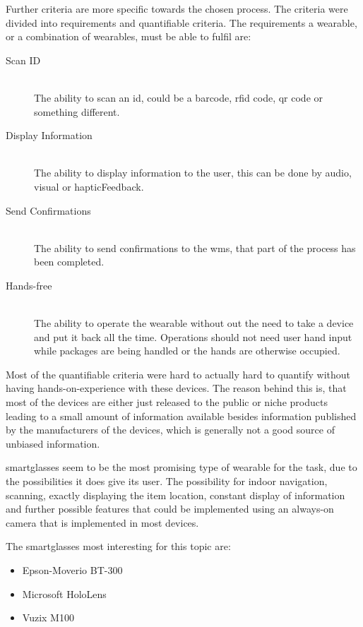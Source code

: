 Further criteria are more specific towards the chosen process. The criteria were divided into requirements and quantifiable criteria. The requirements a wearable, or a combination of wearables, must be able to fulfil are:
\begin{description}
	\item[Scan ID] \hfill \\
		The ability to scan an \gls{id}, could be a barcode, \gls{rfid} code, \gls{qr} code or something different.
	\item[Display Information] \hfill \\
		The ability to display information to the user, this can be done by audio, visual or \gls{hapticFeedback}. 
	\item[Send Confirmations] \hfill \\
		The ability to send confirmations to the \gls{wms}, that part of the process has been completed.
	\item[Hands-free] \hfill \\
		The ability to operate the wearable without out the need to take a device and put it back all the time. Operations should not need user hand input while packages are being handled or the hands are otherwise occupied.
\end{description}

Most of the quantifiable criteria were hard to actually hard to quantify without having hands-on-experience with these devices. The reason behind this is, that most of the devices are either just released to the public or niche products leading to a small amount of information available besides information published by the manufacturers of the devices, which is generally not a good source of unbiased information.

\Gls{smartglasses} seem to be the most promising type of wearable for the task, due to the possibilities it does give its user. The possibility for indoor navigation, scanning, exactly displaying the item location, constant display of information and further possible features that could be implemented using an always-on camera that is implemented in most devices. \citep{phdthesis:pickByVision}

The \gls{smartglasses} most interesting for this topic are:

\begin{itemize}
	\item Epson-Moverio BT-300
	\item Microsoft HoloLens
	\item Vuzix M100
\end{itemize}

